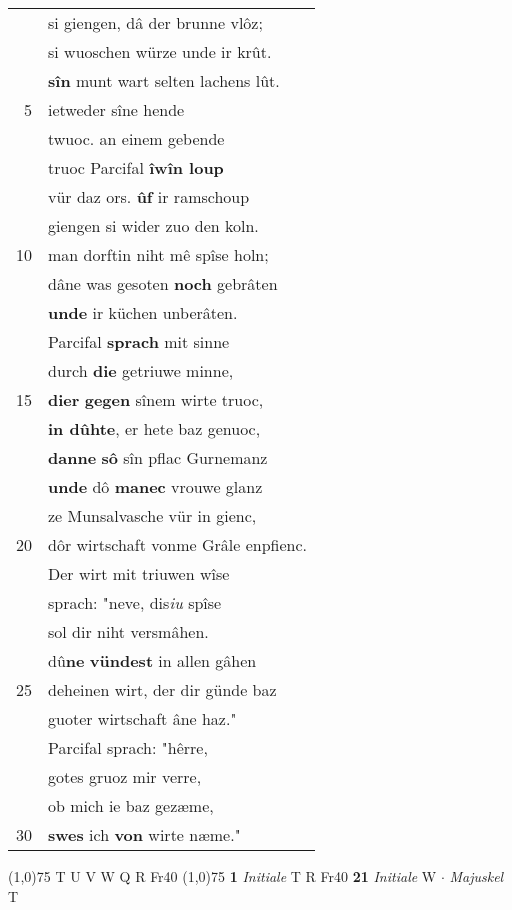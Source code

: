 \documentclass[8pt,a4paper,notitlepage]{article}
\begin{document}
\begin{table}[ht]
\begin{minipage}[t]{0.5\linewidth}
\begin{tabular}{rl}
 & si giengen, dâ der brunne vlôz;\\ 
 & si wuoschen würze unde ir krût.\\ 
 & \textbf{sîn} munt wart selten lachens lût.\\ 
5 & ietweder sîne hende\\ 
 & twuoc. an einem gebende\\ 
 & truoc Parcifal \textbf{îwîn loup}\\ 
 & vür daz ors. \textbf{ûf} ir ramschoup\\ 
 & giengen si wider zuo den koln.\\ 
10 & man dorftin niht mê spîse holn;\\ 
 & dâne was gesoten \textbf{noch} gebrâten\\ 
 & \textbf{unde} ir küchen unberâten.\\ 
 & Parcifal \textbf{sprach} mit sinne\\ 
 & durch \textbf{die} getriuwe minne,\\ 
15 & \textbf{dier} \textbf{gegen} sînem wirte truoc,\\ 
 & \textbf{in dûhte}, er hete baz genuoc,\\ 
 & \textbf{danne} \textbf{sô} sîn pflac Gurnemanz\\ 
 & \textbf{unde} dô \textbf{manec} vrouwe glanz\\ 
 & ze Munsalvasche vür in gienc,\\ 
20 & dôr wirtschaft vonme Grâle enpfienc.\\ 
 & Der wirt mit triuwen wîse\\ 
 & sprach: "neve, dis\textit{iu} spîse\\ 
 & sol dir niht versmâhen.\\ 
 & dû\textbf{ne} \textbf{vündest} in allen gâhen\\ 
25 & deheinen wirt, der dir günde baz\\ 
 & guoter wirtschaft âne haz."\\ 
 & Parcifal sprach: "hêrre,\\ 
 & gotes gruoz mir verre,\\ 
 & ob mich ie baz gezæme,\\ 
30 & \textbf{swes} ich \textbf{von} wirte næme."\\ 
\end{tabular}
\scriptsize
\line(1,0){75} \newline
T U V W Q R Fr40 \newline
\line(1,0){75} \newline
\textbf{1} \textit{Initiale} T R Fr40  \textbf{21} \textit{Initiale} W   $\cdot$ \textit{Majuskel} T  \newline

\end{minipage}
\end{table}
\end{document}
